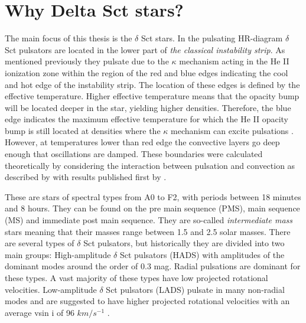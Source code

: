 
\section{Why Delta Sct stars?}
\label{sec:why}

The main focus of this thesis is the $\delta$ Sct stars. In the pulsating HR-diagram $\delta$ Sct pulsators are located in the lower part of \textit{the classical instability strip}. As mentioned previously they pulsate due to the $\kappa$ mechanism acting in the He II ionization zone within the region of the red and blue edges indicating the cool and hot edge of the instability strip. The location of these edges is defined by the effective temperature. Higher effective temperature means that the opacity bump will be located deeper in the star, yielding higher densities. Therefore, the blue edge indicates the maximum effective temperature for which the He II opacity bump is still located at densities where the $\kappa$ mechanism can excite pulsations \citet{pamyatnykh2000}. However, at temperatures lower than red edge the convective layers go deep enough that oscillations are damped. These boundaries were calculated theoretically by considering the interaction between pulsation and convection as described by \citep{grigahcene2005convection} with results published first by \citet{dupret2004theoretical}.  

These are stars of spectral types from A0 to F2, with periods between 18 minutes and 8 hours. They can be found on the pre main sequence (PMS), main sequence (MS) and immediate post main sequence. They are so-called \textit{intermediate mass} stars meaning that their masses range between 1.5 and 2.5 solar masses. There are several types of $\delta$ Sct pulsators, but historically they are divided into two main groups: High-amplitude $\delta$ Sct pulsators (HADS) with amplitudes of the dominant modes around the order of 0.3 mag. Radial pulsations are dominant for these types. A vast majority of these types have low projected rotational velocities. Low-amplitude $\delta$ Sct pulsators (LADS) pulsate in many non-radial modes and are suggested to have higher projected rotational velocities with an average vsin i of 96 $km / s^{-1}$ \citep{solano1997spectroscopic}.

